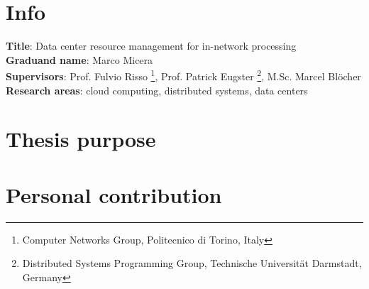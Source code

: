 


\noindent

\newcommand*\THESISSUMMARY{}



%
%
%
%

\section{Info}
\textbf{Title}: Data center resource management for in-network processing\\
\textbf{Graduand name}: Marco Micera\\
\textbf{Supervisors}: Prof. Fulvio Risso \footnote[2]{\label{polito} Computer Networks Group, Politecnico di Torino, Italy}, Prof. Patrick Eugster \footnote[3]{\label{tuda} Distributed Systems Programming Group, Technische Universit{\"a}t Darmstadt, Germany}, M.Sc. Marcel Bl{\"o}cher \\
\textbf{Research areas}: cloud computing, distributed systems, data centers

\section{Thesis purpose}


% 

% 

\section{Personal contribution}

